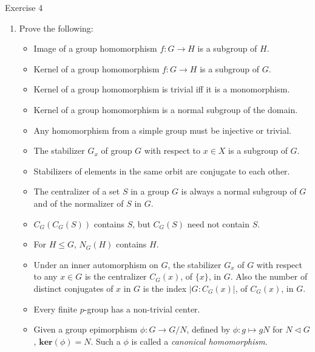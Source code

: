 \documentclass{beamer}
\newcounter{savedenum}
\newcommand*{\saveenum}{\setcounter{savedenum}{\theenumi}}
\newcommand\italictext[1]{\textcolor{italics}{\textit{#1}}}
\begin{document}
\begin{frame}{Exercise 4}
    \begin{enumerate}
        \item Prove the following:
        \begin{itemize}
            \item Image of a group homomorphism $f:G\xrightarrow{}H$ is a subgroup of $H$.
            \item Kernel of a group homomorphism $f:G\xrightarrow{}H$ is a subgroup of $G$.
            \item Kernel of a group homomorphism is trivial iff it is a monomorphism.
            \item Kernel of a group homomorphism is a normal subgroup of the domain.
            \item Any homomorphism from a simple group must be injective or trivial.
            \item The stabilizer $G_x$ of group $G$ with respect to $x\in X$ is a subgroup of $G$.
            \item Stabilizers of elements in the same orbit are conjugate to each other.
            \item The centralizer of a set $S$ in a group $G$ is always a normal subgroup of $G$ and of the normalizer of $S$ in $G$.
            \item $C_G(C_G(S))$ contains $S$, but $C_G(S)$ need not contain $S$.
            \item For $H\leq G$, $N_G(H)$ contains $H$.
            \item\label{ex_class_eq} Under an inner automorphism on $G$, the stabilizer $G_x$ of $G$ with respect to any $x\in G$ is the centralizer $C_G(x)$, of $\{x\}$, in $G$. Also the number of distinct conjugates of $x$ in $G$ is the index $\lvert G:C_G(x)\rvert$, of $C_G(x)$, in $G$.
            \item Every finite $p$-group has a non-trivial center.
            \item Given a group epimorphism $\phi:G\xrightarrow{}G/N$, defined by $\phi:g\mapsto gN$ for $N\vartriangleleft G$, $\mathbf{ker}(\phi)=N$. Such a $\phi$ is called a \italictext{canonical homomorphism}.
        \end{itemize}
        \saveenum
    \end{enumerate}
\end{frame}
\end{document}

